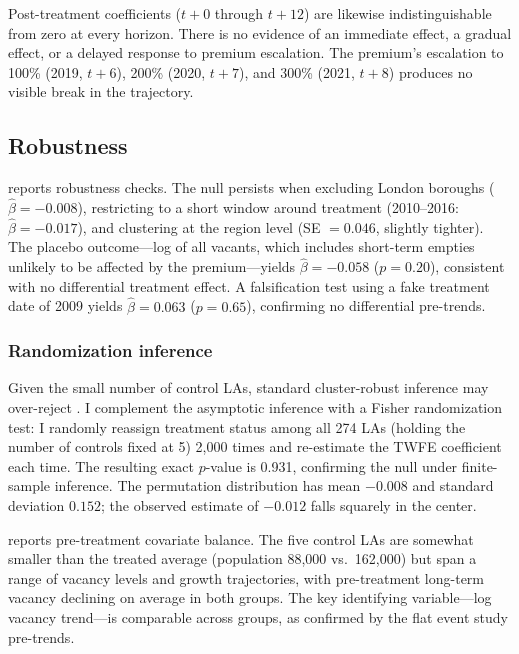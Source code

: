 \documentclass[12pt]{article}
\begin{document}
Post-treatment coefficients ($t + 0$ through $t + 12$) are likewise indistinguishable from zero at every horizon. There is no evidence of an immediate effect, a gradual effect, or a delayed response to premium escalation. The premium's escalation to 100\% (2019, $t + 6$), 200\% (2020, $t + 7$), and 300\% (2021, $t + 8$) produces no visible break in the trajectory.

\subsection{Robustness}



 reports robustness checks. The null persists when excluding London boroughs ($\hat{\beta} = -0.008$), restricting to a short window around treatment (2010--2016: $\hat{\beta} = -0.017$), and clustering at the region level (SE $= 0.046$, slightly tighter). The placebo outcome---log of all vacants, which includes short-term empties unlikely to be affected by the premium---yields $\hat{\beta} = -0.058$ ($p = 0.20$), consistent with no differential treatment effect. A falsification test using a fake treatment date of 2009 yields $\hat{\beta} = 0.063$ ($p = 0.65$), confirming no differential pre-trends.

\subsubsection*{Randomization inference} Given the small number of control LAs, standard cluster-robust inference may over-reject \citep{cameron2015practitioners}. I complement the asymptotic inference with a Fisher randomization test: I randomly reassign treatment status among all 274 LAs (holding the number of controls fixed at 5) 2,000 times and re-estimate the TWFE coefficient each time. The resulting exact $p$-value is 0.931, confirming the null under finite-sample inference. The permutation distribution has mean $-0.008$ and standard deviation $0.152$; the observed estimate of $-0.012$ falls squarely in the center.



 reports pre-treatment covariate balance. The five control LAs are somewhat smaller than the treated average (population 88,000 vs.\ 162,000) but span a range of vacancy levels and growth trajectories, with pre-treatment long-term vacancy declining on average in both groups. The key identifying variable---log vacancy trend---is comparable across groups, as confirmed by the flat event study pre-trends.
\end{document}
